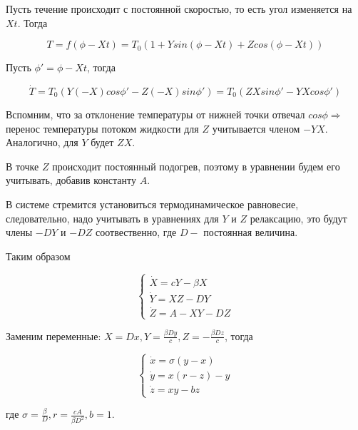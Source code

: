 \documentclass[12pt]{article}
\theoremstyle{definition}
\theoremstyle{definition}
\theoremstyle{definition}
\begin{document}
Пусть течение происходит с постоянной скоростью, то есть угол изменяется на $Xt$. Тогда

\begin{equation}
	T=f(\phi-Xt)=T_0(1+Ysin(\phi-Xt)+Zcos(\phi-Xt))
\end{equation}

Пусть $\phi'=\phi-Xt$, тогда

\begin{equation}
	\dot{T}=T_0(Y(-X)cos\phi'-Z(-X)sin\phi')=T_0(ZXsin\phi'-YXcos\phi')
\end{equation}

Вспомним, что за отклонение температуры от нижней точки отвечал $cos\phi \Longrightarrow$ перенос температуры потоком жидкости для $Z$ учитывается членом $-YX$. Аналогично, для $Y$ будет $ZX$.

В точке $Z$ происходит постоянный подогрев, поэтому в уравнении будем его учитывать, добавив константу $A$. 

В системе стремится установиться термодинамическое равновесие, следовательно, надо учитывать в уравнениях для $Y$ и $Z$ релаксацию, это будут члены $-DY$ и $-DZ$ соотвественно, где $D -$ постоянная величина.

Таким образом

$$\begin{cases}
	\dot{X} = cY-\beta X \\
	\dot{Y} = XZ-DY \\
	\dot{Z} = A-XY-DZ
\end{cases}$$

Заменим переменные: $X=Dx, Y=\frac{\beta Dy}{c}, Z=-\frac{\beta Dz}{c}$, тогда

$$\begin{cases}	
	\dot{x} = \sigma (y-x) \\
	\dot{y} = x(r-z)-y \\
	\dot{z} = xy-bz
\end{cases}$$

где $\sigma = \frac{\beta}{D}, r=\frac{cA}{\beta D^2}, b=1$.
\end{document}
